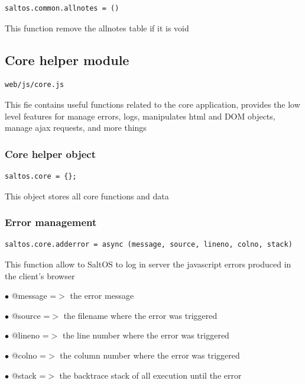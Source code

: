 \documentclass[a4paper]{article}
\begin{document}
\begin{lstlisting}
saltos.common.allnotes = ()
\end{lstlisting}

This function remove the allnotes table if it is void

\hypertarget{toc132}{}
\subsection{Core helper module}

\begin{lstlisting}
web/js/core.js
\end{lstlisting}

This fie contains useful functions related to the core application, provides the low level features
for manage errors, logs, manipulates html and DOM objects, manage ajax requests, and more things

\hypertarget{toc133}{}
\subsubsection{Core helper object}

\begin{lstlisting}
saltos.core = {};
\end{lstlisting}

This object stores all core functions and data

\hypertarget{toc134}{}
\subsubsection{Error management}

\begin{lstlisting}
saltos.core.adderror = async (message, source, lineno, colno, stack)
\end{lstlisting}

This function allow to SaltOS to log in server the javascript errors produced in the
client's browser

\begin{compactitem}
\item[\color{myblue}$\bullet$] @message =$>$ the error message
\item[\color{myblue}$\bullet$] @source  =$>$ the filename where the error was triggered
\item[\color{myblue}$\bullet$] @lineno  =$>$ the line number where the error was triggered
\item[\color{myblue}$\bullet$] @colno   =$>$ the column number where the error was triggered
\item[\color{myblue}$\bullet$] @stack   =$>$ the backtrace stack of all execution until the error
\end{compactitem}
\end{document}
